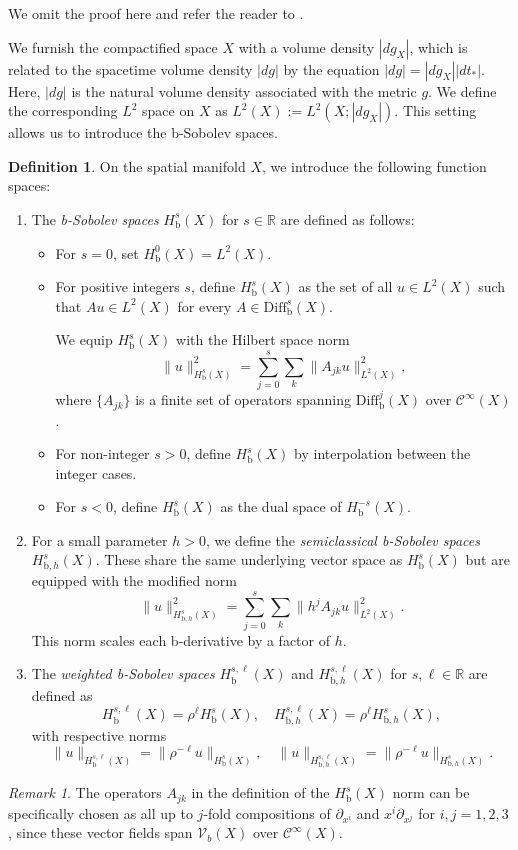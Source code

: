 \documentclass[10pt,a4paper,reqno]{amsart}
\newcommand{\Hb}{H_\text{b}}
\newcommand{\Hbh}{H_{\text{b},h}}
\theoremstyle{definition}
\newtheorem{definition}[theorem]{Definition}
\theoremstyle{remark}
\newtheorem{remark}[theorem]{Remark}
\numberwithin{equation}{section}
\newcommand{\Diffb}{\mathrm{Diff}_\mathrm{b}}
\begin{document}
\noindent
We omit the proof here and refer the reader to \cite[Lemma 2.7]{Hin22}.

We furnish the compactified space $X$ with a volume density $|dg_X|$, which is related to the spacetime volume density $|dg|$ by the equation $|dg| = |dg_X| |dt_*|$. Here, $|dg|$ is the natural volume density associated with the metric $g$. We define the corresponding $L^2$ space on $X$ as $L^2(X) := L^2(X; |dg_X|)$. This setting allows us to introduce the b-Sobolev spaces.



\begin{definition}
\label{def:bSobolev}
  On the spatial manifold $X$, we introduce the following function spaces:
  \begin{enumerate}
  \item The \textit{b-Sobolev spaces} $\Hb^s(X)$ for $s \in \mathbb{R}$ are defined as follows:
    \begin{itemize}
      \item For $s = 0$, set $\Hb^0(X) = L^2(X)$.
      \item For positive integers $s$, define $\Hb^s(X)$ as the set of all $u \in L^2(X)$ such that $Au \in L^2(X)$ for every $A \in \Diffb^s(X)$.

      We equip $\Hb^s(X)$ with the Hilbert space norm
    \[
      \|u\|_{\Hb^s(X)}^2 = \sum_{j=0}^{s} \sum_k \|A_{jk}u\|_{L^2(X)}^2,
    \]
    where $\{A_{jk}\}$ is a finite set of operators spanning $\Diffb^j(X)$ over $\mathcal{C}^\infty(X)$. 
      \item For non-integer $s > 0$, define $\Hb^s(X)$ by interpolation between the integer cases.
      \item For $s < 0$, define $\Hb^s(X)$ as the dual space of $\Hb^{-s}(X)$.
    \end{itemize}
  
  \item For a small parameter $h > 0$, we define the \textit{semiclassical b-Sobolev spaces} $\Hbh^s(X)$. These share the same underlying vector space as $\Hb^s(X)$ but are equipped with the modified norm
    \[   \|u\|_{\Hbh^s(X)}^2 = \sum_{j=0}^s \sum_k \|h^j A_{jk}u\|_{L^2(X)}^2. \]
    This norm scales each b-derivative by a factor of $h$.
  
  \item The \textit{weighted b-Sobolev spaces} $\Hb^{s,\ell}(X)$ and $\Hbh^{s,\ell}(X)$ for $s, \ell \in \mathbb{R}$ are defined as
    \[
      \Hb^{s,\ell}(X) = \rho^\ell \Hb^s(X), \quad \Hbh^{s,\ell}(X) = \rho^\ell \Hbh^s(X),
    \]
    with respective norms
    \[
      \|u\|_{\Hb^{s,\ell}(X)} = \|\rho^{-\ell}u\|_{\Hb^s(X)}, \quad \|u\|_{\Hbh^{s,\ell}(X)} = \|\rho^{-\ell}u\|_{\Hbh^s(X)}.
    \]
  \end{enumerate}
\end{definition}
\begin{remark}
The operators $A_{jk}$ in the definition of the $\Hb^s(X)$ norm can be specifically chosen as all up to $j$-fold compositions of $\partial_{x^i}$ and $x^i\partial_{x^j}$ for $i,j=1,2,3$, since these vector fields span $\mathcal{V}_b(X)$ over $\mathcal{C}^\infty(X)$.
\end{remark}
\end{document}
